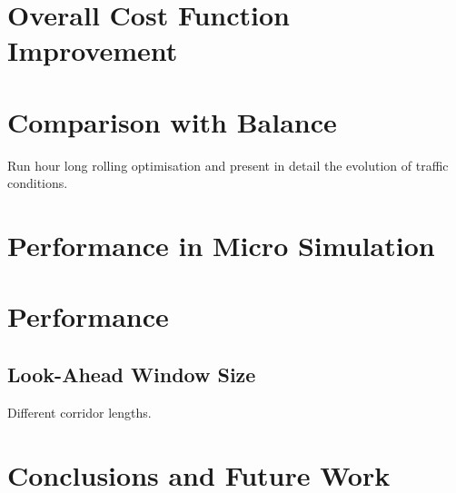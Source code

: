 \section{Overall Cost Function Improvement}

\section{Comparison with Balance}
Run hour long rolling optimisation and present in detail the evolution of traffic conditions.


\section{Performance in Micro Simulation}

\section{Performance}

\subsection{Look-Ahead Window Size} \label{res:windowsizing}

Different corridor lengths.


\section{Conclusions and Future Work}

